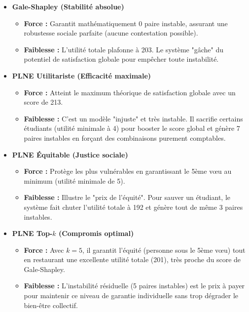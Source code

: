 \documentclass{article}
\begin{document}
\begin{itemize}
    \item \textbf{Gale-Shapley (Stabilité absolue)}
    \begin{itemize}
        \item \textbf{Force :} Garantit mathématiquement 0 paire instable, assurant une robustesse sociale parfaite (aucune contestation possible).
        \item \textbf{Faiblesse :} L'utilité totale plafonne à 203. Le système "gâche" du potentiel de satisfaction globale pour empêcher toute instabilité.
    \end{itemize}

    \item \textbf{PLNE Utilitariste (Efficacité maximale)}
    \begin{itemize}
        \item \textbf{Force :} Atteint le maximum théorique de satisfaction globale avec un score de 213.
        \item \textbf{Faiblesse :} C'est un modèle "injuste" et très instable. Il sacrifie certains étudiants (utilité minimale à 4) pour booster le score global et génère 7 paires instables en forçant des combinaisons purement comptables.
    \end{itemize}

    \item \textbf{PLNE Équitable (Justice sociale)}
    \begin{itemize}
        \item \textbf{Force :} Protège les plus vulnérables en garantissant le 5ème vœu au minimum (utilité minimale de 5).
        \item \textbf{Faiblesse :} Illustre le "prix de l'équité". Pour sauver un étudiant, le système fait chuter l'utilité totale à 192 et génère tout de même 3 paires instables.
    \end{itemize}

    \item \textbf{PLNE Top-$k$ (Compromis optimal)}
    \begin{itemize}
        \item \textbf{Force :} Avec $k=5$, il garantit l'équité (personne sous le 5ème vœu) tout en restaurant une excellente utilité totale (201), très proche du score de Gale-Shapley.
        \item \textbf{Faiblesse :} L'instabilité résiduelle (5 paires instables) est le prix à payer pour maintenir ce niveau de garantie individuelle sans trop dégrader le bien-être collectif.
    \end{itemize}
\end{itemize}
\end{document}
